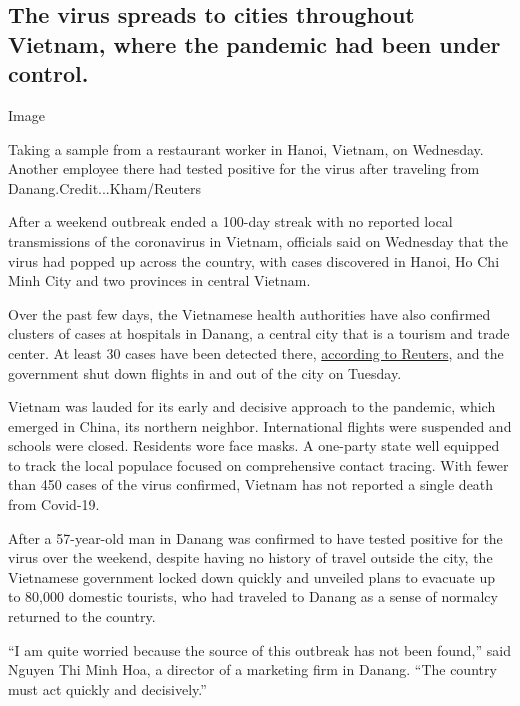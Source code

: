 \hypertarget{the-virus-spreads-to-cities-throughout-vietnam-where-the-pandemic-had-been-under-control}{%
\subsection{The virus spreads to cities throughout Vietnam, where the
pandemic had been under
control.}\label{the-virus-spreads-to-cities-throughout-vietnam-where-the-pandemic-had-been-under-control}}

Image

Taking a sample from a restaurant worker in Hanoi, Vietnam, on
Wednesday. Another employee there had tested positive for the virus
after traveling from Danang.Credit...Kham/Reuters

After a weekend outbreak ended a 100-day streak with no reported local
transmissions of the coronavirus in Vietnam, officials said on Wednesday
that the virus had popped up across the country, with cases discovered
in Hanoi, Ho Chi Minh City and two provinces in central Vietnam.

Over the past few days, the Vietnamese health authorities have also
confirmed clusters of cases at hospitals in Danang, a central city that
is a tourism and trade center. At least 30 cases have been detected
there,
\href{https://www.nytimes3xbfgragh.onion/reuters/2020/07/29/world/asia/29reuters-health-coronavirus-vietnam.html}{according
to Reuters}, and the government shut down flights in and out of the city
on Tuesday.

Vietnam was lauded for its early and decisive approach to the pandemic,
which emerged in China, its northern neighbor. International flights
were suspended and schools were closed. Residents wore face masks. A
one-party state well equipped to track the local populace focused on
comprehensive contact tracing. With fewer than 450 cases of the virus
confirmed, Vietnam has not reported a single death from Covid-19.

After a 57-year-old man in Danang was confirmed to have tested positive
for the virus over the weekend, despite having no history of travel
outside the city, the Vietnamese government locked down quickly and
unveiled plans to evacuate up to 80,000 domestic tourists, who had
traveled to Danang as a sense of normalcy returned to the country.

``I am quite worried because the source of this outbreak has not been
found,'' said Nguyen Thi Minh Hoa, a director of a marketing firm in
Danang. ``The country must act quickly and decisively.''

